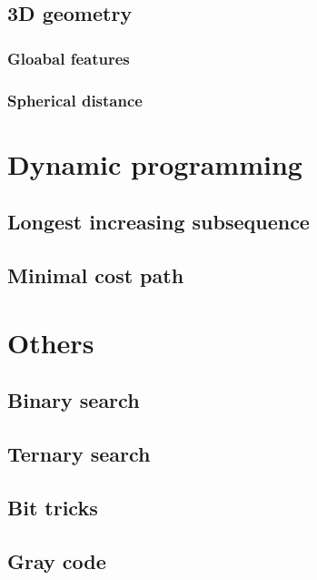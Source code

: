 \documentclass[a4paper]{article}
\begin{document}
    \subsection{3D geometry}
        \subsubsection{Gloabal features}
            
        \subsubsection{Spherical distance}
            

\section{Dynamic programming}
    \subsection{Longest increasing subsequence}
        
    \subsection{Minimal cost path}
        

\section{Others}
    \subsection{Binary search}
        
    \subsection{Ternary search}
        
    \subsection{Bit tricks}
        
    \subsection{Gray code}
        
\end{document}
